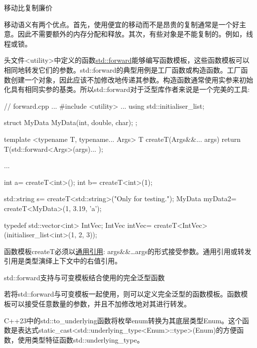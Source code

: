 \begin{myTip}{移动比复制廉价}
	
移动语义有两个优点。首先，使用便宜的移动而不是昂贵的复制通常是一个好主意。因此不需要额外的内存分配和释放。其次，有些对象是不能复制的。例如，线程或锁。

\end{myTip}


头文件<utility>中定义的函数\href{http://en.cppreference.com/w/cpp/utility/forward}{std::forward}能够编写函数模板，这些函数模板可以相同地转发它们的参数。std::forward的典型用例是工厂函数或构造函数。工厂函数创建一个对象，因此应该不加修改地传递其参数。构造函数通常使用实参来初始化具有相同实参的基类。所以std::forward对于泛型库作者来说是一个完美的工具:


\begin{cpp}
// forward.cpp
...
#include <utility>
...
using std::initialiser_list;

struct MyData{
	MyData(int, double, char){};
};

template <typename T, typename... Args>
T createT(Args&&... args){
	return T(std::forward<Args>(args)... );
}

...

int a= createT<int>();
int b= createT<int>(1);

std::string s= createT<std::string>("Only for testing.");
MyData myData2= createT<MyData>(1, 3.19, 'a');

typedef std::vector<int> IntVec;
IntVec intVec= createT<IntVec>(initialiser_list<int>({1, 2, 3}));
\end{cpp}

函数模板createT必须以\href{https://isocpp.org/blog/2012/11/universal-references-in-c11-scott-meyers}{通用引用}: args\&\&…args的形式接受参数。通用引用或转发引用是类型演绎上下文中的右值引用。

\begin{myTip}{std::forward支持与可变模板结合使用的完全泛型函数}
	
若将std::forward与可变模板一起使用，则可以定义完全泛型的函数模板。函数模板可以接受任意数量的参数，并且不加修改地对其进行转发。
	
\end{myTip}


C++23中的std::to\_underlying函数将枚举enum转换为其底层类型Enum。这个函数是表达式static\_cast<std::underlying\_type<Enum>::type>(Enum)的方便函数，使用类型特征函数std::underlying\_type。


